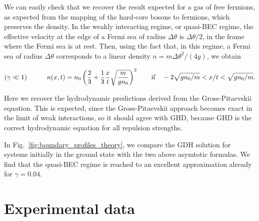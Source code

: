 We can easily check that we recover the result expected for a gas of free fermions, as expected from the mapping of the hard-core bosons to fermions, which preserves the density\cite{girardeau_relationship_1960}. 
In the weakly interacting regime, or quasi-BEC regime, the effective velocity at the edge of a Fermi sea of radius $\Delta\theta$ is 
$\Delta\theta/2$, in the frame where the Fermi sea is at rest. Then, using the fact that, in this regime, a Fermi sea of radius $\Delta\theta$ corresponds to a linear density $n=m\Delta\theta^2/(4 g)$, we obtain

\begin{equation}
   (\gamma \ll 1) \qquad \quad  n(x,t)= 
    n_0 \left ( \frac{2}{3}+ \frac{1}{3} \frac{x}{ t}\sqrt{\frac{m}{gn_0}} \right )^2 \qquad  {\rm if} \quad  -2\sqrt{gn_0/m}   < x/t < \sqrt{gn_0/m}.
    \label{eq:GPE}
\end{equation}

Here we recover the hydrodynamic predictions derived from the Gross-Pitaevskii equation\cite{el_decay_1995,xu_dispersive_2017}. This is expected, since the Gross-Pitaevskii approach becomes exact in the limit of weak interactions, so it should agree with GHD, because GHD is the correct hydrodynamic equation for all repulsion strengths. 





In Fig.~\ref{fig:boundary_profiles_theory}, we compare the  GDH solution for 
systems initially in the ground state with the two above asymtotic formulas. We find that the quasi-BEC regime is reached to an excellent approximation already for $\gamma = 0.04$. 

\section{Experimental data}\label{sec.ed}


